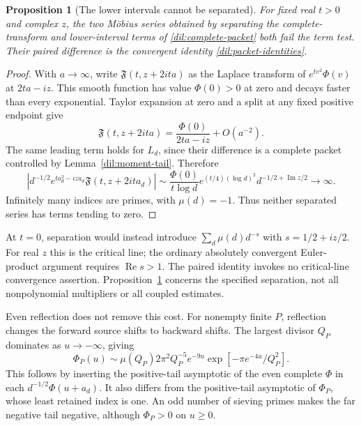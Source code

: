 \documentclass[11pt]{article}
\numberwithin{equation}{section}
\newtheorem{proposition}[theorem]{Proposition}
\theoremstyle{definition}
\theoremstyle{remark}
\begin{document}
\begin{proposition}[The lower intervals cannot be separated]
\label{dil:separated-divergence}
For fixed real $t>0$ and complex $z$, the two M\"obius series obtained
by separating the complete-transform and lower-interval terms of
\eqref{dil:complete-packet} both fail the term test. Their paired
difference is the convergent identity \eqref{dil:packet-identities}.
\end{proposition}
\begin{proof}
With $a\to\infty$, write $\mathfrak F(t,z+2ita)$ as the Laplace
transform of $e^{tv^2}\Phi(v)$ at $2ta-iz$. This smooth function has
value $\Phi(0)>0$ at zero and decays faster than every exponential.
Taylor expansion at zero and a split at any fixed positive endpoint give
\begin{equation}
 \mathfrak F(t,z+2ita)=\frac{\Phi(0)}{2ta-iz}+O(a^{-2}).
 \label{dil:laplace-endpoint}
\end{equation}
The same leading term holds for $L_d$, since their difference is a
complete packet controlled by Lemma~\ref{dil:moment-tail}. Therefore
\begin{equation}
 \left|d^{-1/2}e^{ta_d^2-iza_d}\mathfrak F(t,z+2ita_d)\right|
 \sim\frac{\Phi(0)}{t\log d}
 e^{(t/4)(\log d)^2}d^{-1/2+\operatorname{Im}z/2}
 \longrightarrow\infty.
 \label{dil:separated-growth}
\end{equation}
Infinitely many indices are primes, with $\mu(d)=-1$. Thus neither
separated series has terms tending to zero.
\end{proof}

At $t=0$, separation would instead introduce
$\sum_d\mu(d)d^{-s}$ with $s=1/2+iz/2$.
For real $z$ this is the critical line; the ordinary absolutely convergent
Euler-product argument requires $\operatorname{Re}s>1$.
The paired identity invokes no critical-line convergence assertion.
Proposition~\ref{dil:separated-divergence} concerns the specified separation,
not all nonpolynomial multipliers or all coupled estimates.

Even reflection does not remove this cost. For nonempty finite $P$,
reflection changes the forward source shifts to backward shifts.
The largest divisor $Q_P$ dominates as $u\to-\infty$, giving
\begin{equation}
 \Phi_P(u)\sim\mu(Q_P)2\pi^2Q_P^{-5}e^{-9u}
                    \exp[-\pi e^{-4u}/Q_P^2].
 \label{dil:sieve-negative-tail}
\end{equation}
This follows by inserting the positive-tail asymptotic of the even
complete $\Phi$ in each $d^{-1/2}\Phi(u+a_d)$.
It also differs from the positive-tail asymptotic of $\Phi_P$, whose
least retained index is one. An odd number of sieving primes makes the
far negative tail negative, although $\Phi_P>0$ on $u\ge0$.
\end{document}

